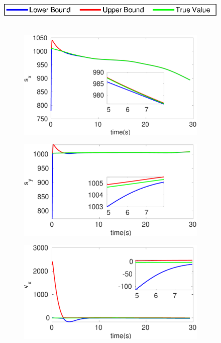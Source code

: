 \begin{figure}[h]
\hspace*{\fill} \includegraphics[scale=0.8]{figures/legend}\\\\
\begin{subfigure}{.5\linewidth}
\centering
\includegraphics[width=\linewidth]{figures/Prad/s3caprads_x}
\end{subfigure}
\begin{subfigure}{.5\linewidth}
\centering
\includegraphics[width=\linewidth]{figures/Prad/s3caprads_y}
\end{subfigure}
\begin{subfigure}{.5\linewidth}
\centering
\includegraphics[width=\linewidth]{figures/Prad/s3capradv_x}

\end{subfigure}
\end{figure}
